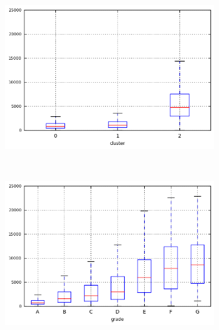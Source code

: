\begin{anexosenv}
\begin{figure}[t!]
\begin{subfigure}[t]{0.45\textwidth}
            \centerline{\includegraphics[width=1.05\textwidth]{img/total_rec_int_by_cluster}}
        \end{subfigure}%
        ~ 
        \begin{subfigure}[t]{0.45\textwidth}
            \centering
   
            \centerline{\includegraphics[width=1.05\textwidth]{img/total_rec_int_by_grade}}

        \end{subfigure}
\end{figure}



\begin{figure}[t!]
    \centering
        \caption{\emph{Boxplots} de total\textunderscore pymnt\textunderscore inv }
        \begin{subfigure}[t]{0.45\textwidth}
            \centering


\end{subfigure}
\end{figure}
\end{anexosenv}
